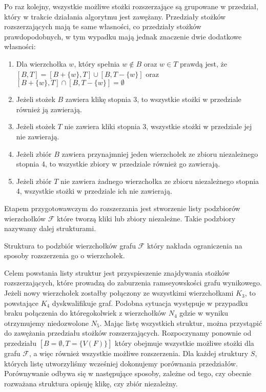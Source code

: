 Po raz kolejny, wszystkie możliwe stożki rozszerzające są grupowane w przedział, który w trakcie działania algorytmu jest zawężany. Przedziały stożków rozszerzających mają te same własności, co przedziały stożków prawdopodobnych, w tym wypadku mają jednak znaczenie dwie dodatkowe własności:

\begin{enumerate}
\item Dla wierzchołka $w$, który spełnia $w \notin B$ oraz $w\in T$ prawdą jest, że $[B, T] = [B + \{ w\}, T] \cup [B , T - \{ w\}]$ oraz $[B +\{ w\}, T] \cap [B , T - \{ w\}] = \emptyset$

\item Jeżeli stożek $B$ zawiera klikę stopnia 3, to wszystkie stożki w przedziale również ją zawierają. 

\item Jeżeli stożek $T$ nie zawiera kliki stopnia 3, wszystkie stożki w przedziale jej nie zawierają.

																													  
				 
\item Jeżeli zbiór $B$ zawiera przynajmniej jeden wierzchołek ze zbioru niezależnego stopnia 4, to wszystkie zbiory w przedziale również go zawierają. 

\item Jeżeli zbiór $T$ nie zawiera żadnego wierzchołka ze zbioru niezależnego stopnia 4, wszystkie stożki w przedziale ich nie zawierają.
\end {enumerate}



Etapem przygotowawczym do rozszerzania jest stworzenie listy podzbiorów wierzchołków $\mathcal{F}$ które tworzą kliki lub zbiory niezależne. Takie podzbiory nazywamy dalej strukturami.
\begin{definition} Struktura to podzbiór wierzchołków grafu $\mathcal{F}$ który nakłada ograniczenia na sposoby rozszerzenia go o wierzchołek.
\end{definition}
Celem powstania listy struktur jest przyspieszenie znajdywania stożków rozszerzających, które prowadzą do zaburzenia ramseyowskości grafu wynikowego. Jeżeli nowy wierzchołek zostałby połączony ze wszystkimi wierzchołkami $K_3$, to powstające $K_4$ dyskwalifikuje graf. Podobna sytuacja występuje w przypadku braku połączenia do któregokolwiek z wierzchołków $N_4$ gdzie w wyniku otrzymujemy niedozwolone $N_5$. 
Mając listę wszystkich struktur, można przystąpić do zawężania przedziału stożków rozszerzających. Rozpoczynamy ponownie od przedziału $[B = \emptyset, T = \{V(F)\} ]$ który obejmuje wszystkie możliwe stożki dla grafu $\mathcal{F}$, a więc również wszystkie możliwe rozszerzenia. Dla każdej struktury $S$, których listę utworzyliśmy wcześniej dokonujemy porównania przedziałów. Porównywanie odbywa się w następujące sposoby, zależne od tego, czy obecnie rozważana struktura opisuję klikę, czy zbiór niezależny.

